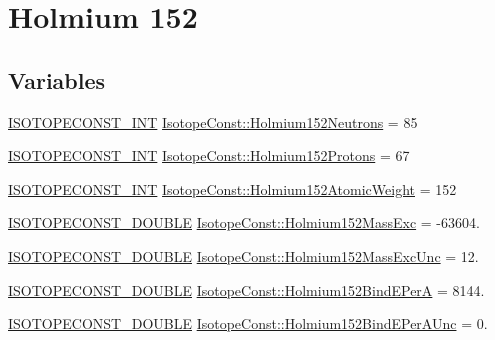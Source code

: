 \hypertarget{group___isotope_const-_holmium-_ho152}{}\section{Holmium 152}
\label{group___isotope_const-_holmium-_ho152}
\subsection*{Variables}
\begin{DoxyCompactItemize}
\item 
\mbox{\hyperlink{group___isotope_const-_macros_ga5f18360b3e99483a35c32d789e62621c}{I\+S\+O\+T\+O\+P\+E\+C\+O\+N\+S\+T\+\_\+\+I\+NT}} \mbox{\hyperlink{group___isotope_const-_holmium-_ho152_gaea457c49d7eda696af5726f56c48b4d9}{Isotope\+Const\+::\+Holmium152\+Neutrons}} = 85
\item 
\mbox{\hyperlink{group___isotope_const-_macros_ga5f18360b3e99483a35c32d789e62621c}{I\+S\+O\+T\+O\+P\+E\+C\+O\+N\+S\+T\+\_\+\+I\+NT}} \mbox{\hyperlink{group___isotope_const-_holmium-_ho152_ga7dc090ed89f4f6e2fff219f640a5bee9}{Isotope\+Const\+::\+Holmium152\+Protons}} = 67
\item 
\mbox{\hyperlink{group___isotope_const-_macros_ga5f18360b3e99483a35c32d789e62621c}{I\+S\+O\+T\+O\+P\+E\+C\+O\+N\+S\+T\+\_\+\+I\+NT}} \mbox{\hyperlink{group___isotope_const-_holmium-_ho152_ga743d6f024f8cf1c5fd4f72f20e50a7f6}{Isotope\+Const\+::\+Holmium152\+Atomic\+Weight}} = 152
\item 
\mbox{\hyperlink{group___isotope_const-_macros_ga8f45a7272ce02c0b4c65c44636ed719a}{I\+S\+O\+T\+O\+P\+E\+C\+O\+N\+S\+T\+\_\+\+D\+O\+U\+B\+LE}} \mbox{\hyperlink{group___isotope_const-_holmium-_ho152_ga5903b12d174c6349128848126b5ab7ed}{Isotope\+Const\+::\+Holmium152\+Mass\+Exc}} = -\/63604.
\item 
\mbox{\hyperlink{group___isotope_const-_macros_ga8f45a7272ce02c0b4c65c44636ed719a}{I\+S\+O\+T\+O\+P\+E\+C\+O\+N\+S\+T\+\_\+\+D\+O\+U\+B\+LE}} \mbox{\hyperlink{group___isotope_const-_holmium-_ho152_gaad736d98a8278e427b0dacc4f3a6de2f}{Isotope\+Const\+::\+Holmium152\+Mass\+Exc\+Unc}} = 12.
\item 
\mbox{\hyperlink{group___isotope_const-_macros_ga8f45a7272ce02c0b4c65c44636ed719a}{I\+S\+O\+T\+O\+P\+E\+C\+O\+N\+S\+T\+\_\+\+D\+O\+U\+B\+LE}} \mbox{\hyperlink{group___isotope_const-_holmium-_ho152_ga4452bac9813f9b0355bebd8e5830be1d}{Isotope\+Const\+::\+Holmium152\+Bind\+E\+PerA}} = 8144.
\item 
\mbox{\hyperlink{group___isotope_const-_macros_ga8f45a7272ce02c0b4c65c44636ed719a}{I\+S\+O\+T\+O\+P\+E\+C\+O\+N\+S\+T\+\_\+\+D\+O\+U\+B\+LE}} \mbox{\hyperlink{group___isotope_const-_holmium-_ho152_ga7ac396b23767cf108c7b9350d0a48dcc}{Isotope\+Const\+::\+Holmium152\+Bind\+E\+Per\+A\+Unc}} = 0.

\end{DoxyCompactItemize}
